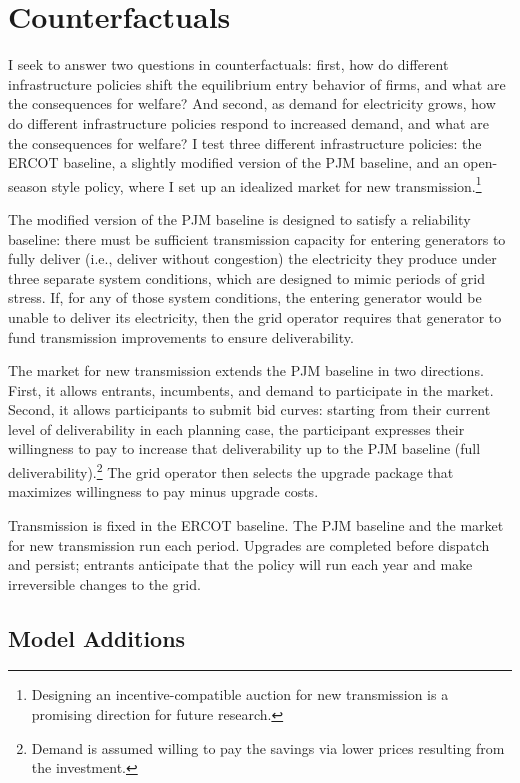 \documentclass[12pt]{article}
\begin{document}
\section{Counterfactuals}
\label{sec:counterfactuals}
I seek to answer two questions in counterfactuals: first, how do different infrastructure policies shift the equilibrium entry behavior of firms, and what are the consequences for welfare? And second, as demand for electricity grows, how do different infrastructure policies respond to increased demand, and what are the consequences for welfare? I test three different infrastructure policies: the ERCOT baseline, a slightly modified version of the PJM baseline, and an open-season style policy, where I set up an idealized market for new transmission.\footnote{Designing an incentive-compatible auction for new transmission is a promising direction for future research.} 

The modified version of the PJM baseline is designed to satisfy a reliability baseline: there must be sufficient transmission capacity for entering generators to fully deliver (i.e., deliver without congestion) the electricity they produce under three separate system conditions, which are designed to mimic periods of grid stress. If, for any of those system conditions, the entering generator would be unable to deliver its electricity, then the grid operator requires that generator to fund transmission improvements to ensure deliverability. 

The market for new transmission extends the PJM baseline in two directions. First, it allows entrants, incumbents, and demand to participate in the market. Second, it allows participants to submit bid curves: starting from their current level of deliverability in each planning case, the participant expresses their willingness to pay to increase that deliverability up to the PJM baseline (full deliverability).\footnote{Demand is assumed willing to pay the savings via lower prices resulting from the investment.} The grid operator then selects the upgrade package that maximizes willingness to pay minus upgrade costs. 

Transmission is fixed in the ERCOT baseline. The PJM baseline and the market for new transmission run each period. Upgrades are completed before dispatch and persist; entrants anticipate that the policy will run each year and make irreversible changes to the grid. 

\subsection{Model Additions}
\end{document}
